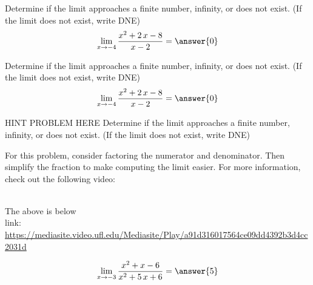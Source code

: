 \documentclass[handout]{ximera}
\begin{document}

\begin{problem}
  \fi
{}  \fi
{}  \fi
Determine if the limit approaches a finite number, infinity, or does not exist. (If the limit does not exist, write DNE)
\[\lim_{x\to{{-4}}}\dfrac{{{x^{2} + 2 \, x - 8}}}{{{x - 2}}}=\answer{0}\]
\end{problem}%



\begin{problem}
Determine if the limit approaches a finite number, infinity, or does not exist. (If the limit does not exist, write DNE)
\[\lim_{x\to{{-4}}}\dfrac{{{x^{2} + 2 \, x - 8}}}{{{x - 2}}}=\answer{0}\]
\end{problem}%



\begin{problem}
HINT PROBLEM HERE Determine if the limit approaches a finite number, infinity, or does not exist. (If the limit does not exist, write DNE)  \vspace{5pt}
\begin{hint}
For this problem, consider factoring the numerator and denominator.  Then simplify the fraction to make computing the limit easier.  For more information, check out the following video:
\end{hint}
\begin{hint}
\\
The above is below\\
{link: \url{https://mediasite.video.ufl.edu/Mediasite/Play/a91d316017564ce09dd4392b3d4cc2031d}}
\end{hint}


\[\lim_{x\to{{-3}}}\dfrac{{{x^{2} + x - 6}}}{{{x^{2} + 5 \, x + 6}}}=\answer{{{5}}}\]
\end{problem}%
\end{document}
